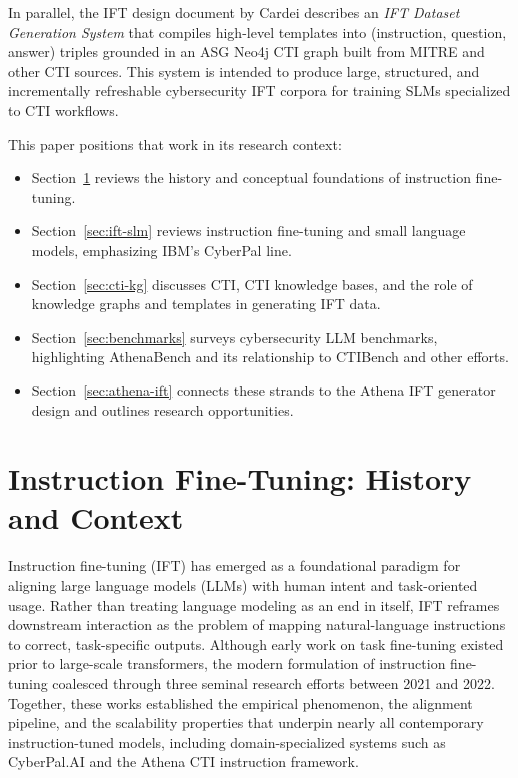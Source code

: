 \documentclass[sigconf]{acmart}
\begin{document}
In parallel, the IFT design document by Cardei describes an \emph{IFT Dataset Generation System} that compiles high-level templates into (instruction, question, answer) triples grounded in an ASG Neo4j CTI graph built from MITRE and other CTI sources.\cite{cardei2025ift} This system is intended to produce large, structured, and incrementally refreshable cybersecurity IFT corpora for training SLMs specialized to CTI workflows.

This paper positions that work in its research context:
\begin{itemize}
  \item Section~\ref{sec:ift-history} reviews the history and conceptual foundations of instruction fine-tuning.
  \item Section~\ref{sec:ift-slm} reviews instruction fine-tuning and small language models, emphasizing IBM's CyberPal line.
  \item Section~\ref{sec:cti-kg} discusses CTI, CTI knowledge bases, and the role of knowledge graphs and templates in generating IFT data.
  \item Section~\ref{sec:benchmarks} surveys cybersecurity LLM benchmarks, highlighting AthenaBench and its relationship to CTIBench and other efforts.
  \item Section~\ref{sec:athena-ift} connects these strands to the Athena IFT generator design and outlines research opportunities.
\end{itemize}


\section{Instruction Fine-Tuning: History and Context}
\label{sec:ift-history}

Instruction fine-tuning (IFT) has emerged as a foundational paradigm for aligning large language models (LLMs) with human intent and task-oriented usage. Rather than treating language modeling as an end in itself, IFT reframes downstream interaction as the problem of mapping natural-language instructions to correct, task-specific outputs. Although early work on task fine-tuning existed prior to large-scale transformers, the modern formulation of instruction fine-tuning coalesced through three seminal research efforts between 2021 and 2022. Together, these works established the empirical phenomenon, the alignment pipeline, and the scalability properties that underpin nearly all contemporary instruction-tuned models, including domain-specialized systems such as CyberPal.AI and the Athena CTI instruction framework.
\end{document}
